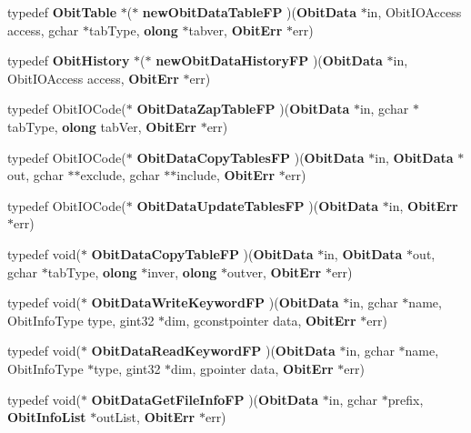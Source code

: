 \begin{CompactItemize}
\item 
typedef {\bf Obit\-Table} $\ast$($\ast$ {\bf new\-Obit\-Data\-Table\-FP} )({\bf Obit\-Data} $\ast$in, Obit\-IOAccess access, gchar $\ast$tab\-Type, {\bf olong} $\ast$tabver, {\bf Obit\-Err} $\ast$err)
\item 
typedef {\bf Obit\-History} $\ast$($\ast$ {\bf new\-Obit\-Data\-History\-FP} )({\bf Obit\-Data} $\ast$in, Obit\-IOAccess access, {\bf Obit\-Err} $\ast$err)
\item 
typedef Obit\-IOCode($\ast$ {\bf Obit\-Data\-Zap\-Table\-FP} )({\bf Obit\-Data} $\ast$in, gchar $\ast$tab\-Type, {\bf olong} tab\-Ver, {\bf Obit\-Err} $\ast$err)
\item 
typedef Obit\-IOCode($\ast$ {\bf Obit\-Data\-Copy\-Tables\-FP} )({\bf Obit\-Data} $\ast$in, {\bf Obit\-Data} $\ast$out, gchar $\ast$$\ast$exclude, gchar $\ast$$\ast$include, {\bf Obit\-Err} $\ast$err)
\item 
typedef Obit\-IOCode($\ast$ {\bf Obit\-Data\-Update\-Tables\-FP} )({\bf Obit\-Data} $\ast$in, {\bf Obit\-Err} $\ast$err)
\item 
typedef void($\ast$ {\bf Obit\-Data\-Copy\-Table\-FP} )({\bf Obit\-Data} $\ast$in, {\bf Obit\-Data} $\ast$out, gchar $\ast$tab\-Type, {\bf olong} $\ast$inver, {\bf olong} $\ast$outver, {\bf Obit\-Err} $\ast$err)
\item 
typedef void($\ast$ {\bf Obit\-Data\-Write\-Keyword\-FP} )({\bf Obit\-Data} $\ast$in, gchar $\ast$name, Obit\-Info\-Type type, gint32 $\ast$dim, gconstpointer data, {\bf Obit\-Err} $\ast$err)
\item 
typedef void($\ast$ {\bf Obit\-Data\-Read\-Keyword\-FP} )({\bf Obit\-Data} $\ast$in, gchar $\ast$name, Obit\-Info\-Type $\ast$type, gint32 $\ast$dim, gpointer data, {\bf Obit\-Err} $\ast$err)
\item 
typedef void($\ast$ {\bf Obit\-Data\-Get\-File\-Info\-FP} )({\bf Obit\-Data} $\ast$in, gchar $\ast$prefix, {\bf Obit\-Info\-List} $\ast$out\-List, {\bf Obit\-Err} $\ast$err)
\end{CompactItemize}
